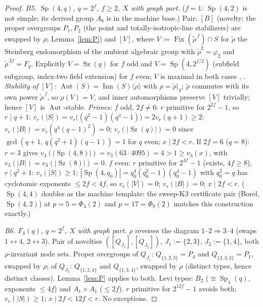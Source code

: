 \documentclass[11pt]{amsart}
\theoremstyle{definition}
\theoremstyle{remark}
\DeclareMathOperator{\Inn}{Inn}
\DeclareMathOperator{\Aut}{Aut}
\DeclareMathOperator{\Fix}{Fix}
\DeclareMathOperator{\Sp}{Sp}
\DeclareMathOperator{\Sz}{Sz}
\newcommand{\vp}[1]{v_{#1}}
\begin{document}
\begin{proof}
\emph{B5. $\Sp(4,q)$, $q=2^f$, $f\geq2$, $X$ with graph part.} ($f=1$:
$\Sp(4,2)$ is not simple; its derived group $A_6$ is in the machine
base.) Pair: $[B]$ (novelty: the proper overgroups $P_1,P_2$ (the point
and totally-isotropic-line stabilizers) are swapped by $\rho$;
Lemma~\ref{lem:P}) and $[V]$, where
$V:=\Fix(\tilde\rho^{\,f})\cap S$ for $\tilde\rho$ the Steinberg
endomorphism of the ambient algebraic group with $\tilde\rho^2=
\varphi_2$ and $\tilde\rho^{\,2f}=F_q$. Explicitly $V=\Sz(q)$ for $f$
odd and $V=\Sp(4,2^{f/2})$ (subfield subgroup, index-two field
extension) for $f$ even; $V$ is maximal in both cases
\cite[Table~8.14]{BHRD}, \cite{Suzuki1962}. \emph{Stability of $[V]$:}
$\Aut(S)=\Inn(S)\langle\rho\rangle$ with $\rho=\tilde\rho|_S$;
$\tilde\rho$ commutes with its own power $\tilde\rho^{\,f}$, so
$\rho(V)=V$, and inner automorphisms preserve $[V]$ trivially; hence
$[V]$ is $\Aut$-stable. \emph{Primes:} $f$ odd, $2f\neq6$: $r$
primitive for $2^{2f}-1$, so $r\mid q+1$:
$\vp{r}(|S|)=\vp{r}\bigl((q^2-1)(q^4-1)\bigr)=2\vp{r}(q+1)\geq2$;
$\vp{r}(|B|)=\vp{r}(q^4(q-1)^2)=0$; $\vp{r}(|\Sz(q)|)=0$ since
$\gcd(q+1,\,q(q^2+1)(q-1))=1$ for $q$ even; $x\mid2f<r$. If $2f=6$
($q=8$): $r=3$ gives $v_3(|\Sp(4,8)|)=v_3(63\cdot4095)=4>1\geq
v_3(x)$, with $v_3(|B|)=v_3(|\Sz(8)|)=0$. $f$ even: $r$ primitive for
$2^{4f}-1$ (exists, $4f\geq8$), $r\mid q^2+1$: $\vp{r}(|S|)\geq1$;
$|\Sp(4,q_0)|=q_0^4(q_0^2-1)(q_0^4-1)$ with $q_0^2=q$ has cyclotomic
exponents $\leq2f<4f$, so $\vp{r}(|V|)=0$; $\vp{r}(|B|)=0$;
$x\mid2f<r$. ($\Sp(4,4)$ doubles as the machine template: the sweep-K3
certificate pair (Borel, $\Sp(4,2)$) at $p=5=\Phi_4(2)$ and
$p=17=\Phi_8(2)$ matches this construction exactly.)

\emph{B6. $F_4(q)$, $q=2^f$, $X$ with graph part.} $\rho$ reverses the
diagram $1$--$2$$\Rightarrow$$3$--$4$ (swaps $1\leftrightarrow4$,
$2\leftrightarrow3$). Pair of novelties $([Q_{J_1}],[Q_{J_2}])$,
$J_1:=\{2,3\}$, $J_2:=\{1,4\}$, both $\rho$-invariant node sets.
Proper overgroups of $Q_{J_1}$: $Q_{\{1,2,3\}}=P_4$ and
$Q_{\{2,3,4\}}=P_1$, swapped by $\rho$; of $Q_{J_2}$: $Q_{\{1,2,4\}}$
and $Q_{\{1,3,4\}}$, swapped by $\rho$ (distinct types, hence distinct
classes). Lemma~\ref{lem:P} applies to both. Levi types: $B_2$
($\cong\Sp_4(q)$, exponents $\leq4f$) and $A_1{\times}A_1$
($\leq2f$). $r$ primitive for $2^{12f}-1$ avoids both;
$\vp{r}(|S|)\geq1$; $x\mid2f<12f<r$. No exceptions.


\end{proof}
\end{document}
